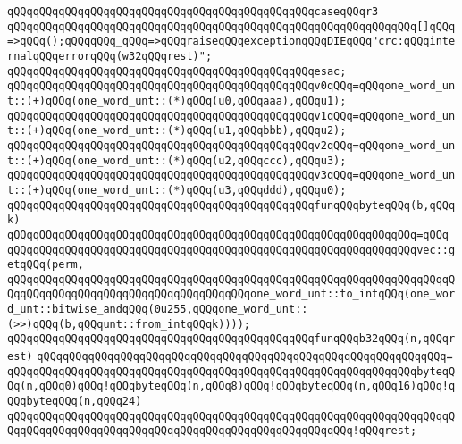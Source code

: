 \newline
\verb|qQQqqQQqqQQqqQQqqQQqqQQqqQQqqQQqqQQqqQQqqQQqqQQqcaseqQQqr3|\newline
\newline
\verb|qQQqqQQqqQQqqQQqqQQqqQQqqQQqqQQqqQQqqQQqqQQqqQQqqQQqqQQqqQQqqQQq[]qQQq=>qQQq();qQQqqQQq_qQQq=>qQQqraiseqQQqexceptionqQQqDIEqQQq"crc:qQQqinternalqQQqerrorqQQq(w32qQQqrest)";|\newline
\verb|qQQqqQQqqQQqqQQqqQQqqQQqqQQqqQQqqQQqqQQqqQQqqQQqesac;|\newline
\newline
\verb|qQQqqQQqqQQqqQQqqQQqqQQqqQQqqQQqqQQqqQQqqQQqqQQqv0qQQq=qQQqone_word_unt::(+)qQQq(one_word_unt::(*)qQQq(u0,qQQqaaa),qQQqu1);|\newline
\verb|qQQqqQQqqQQqqQQqqQQqqQQqqQQqqQQqqQQqqQQqqQQqqQQqv1qQQq=qQQqone_word_unt::(+)qQQq(one_word_unt::(*)qQQq(u1,qQQqbbb),qQQqu2);|\newline
\verb|qQQqqQQqqQQqqQQqqQQqqQQqqQQqqQQqqQQqqQQqqQQqqQQqv2qQQq=qQQqone_word_unt::(+)qQQq(one_word_unt::(*)qQQq(u2,qQQqccc),qQQqu3);|\newline
\verb|qQQqqQQqqQQqqQQqqQQqqQQqqQQqqQQqqQQqqQQqqQQqqQQqv3qQQq=qQQqone_word_unt::(+)qQQq(one_word_unt::(*)qQQq(u3,qQQqddd),qQQqu0);|\newline
\newline
\verb|qQQqqQQqqQQqqQQqqQQqqQQqqQQqqQQqqQQqqQQqqQQqqQQqfunqQQqbyteqQQq(b,qQQqk)|\newline
\verb|qQQqqQQqqQQqqQQqqQQqqQQqqQQqqQQqqQQqqQQqqQQqqQQqqQQqqQQqqQQqqQQq=qQQq|\newline
\verb|qQQqqQQqqQQqqQQqqQQqqQQqqQQqqQQqqQQqqQQqqQQqqQQqqQQqqQQqqQQqqQQqvec::getqQQq(perm,|\newline
\verb|qQQqqQQqqQQqqQQqqQQqqQQqqQQqqQQqqQQqqQQqqQQqqQQqqQQqqQQqqQQqqQQqqQQqqQQqqQQqqQQqqQQqqQQqqQQqqQQqqQQqqQQqqQQqone_word_unt::to_intqQQq(one_word_unt::bitwise_andqQQq(0u255,qQQqone_word_unt::(>>)qQQq(b,qQQqunt::from_intqQQqk))));|\newline
\newline
\verb|qQQqqQQqqQQqqQQqqQQqqQQqqQQqqQQqqQQqqQQqqQQqqQQqfunqQQqb32qQQq(n,qQQqrest)|\newline
\verb|qQQqqQQqqQQqqQQqqQQqqQQqqQQqqQQqqQQqqQQqqQQqqQQqqQQqqQQqqQQqqQQq=|\newline
\verb|qQQqqQQqqQQqqQQqqQQqqQQqqQQqqQQqqQQqqQQqqQQqqQQqqQQqqQQqqQQqqQQqbyteqQQq(n,qQQq0)qQQq!qQQqbyteqQQq(n,qQQq8)qQQq!qQQqbyteqQQq(n,qQQq16)qQQq!qQQqbyteqQQq(n,qQQq24)|\newline
\verb|qQQqqQQqqQQqqQQqqQQqqQQqqQQqqQQqqQQqqQQqqQQqqQQqqQQqqQQqqQQqqQQqqQQqqQQqqQQqqQQqqQQqqQQqqQQqqQQqqQQqqQQqqQQqqQQqqQQqqQQqqQQq!qQQqrest;|\newline
